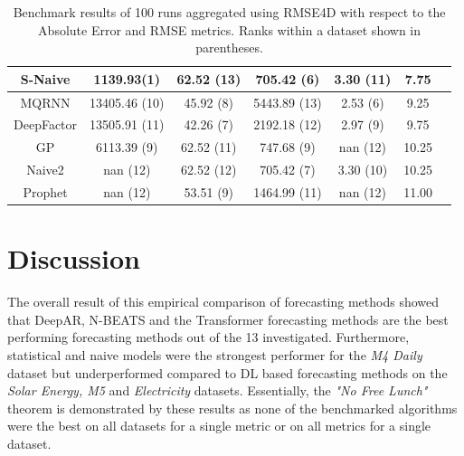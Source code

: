 \begin{table}[htb]
\begin{tabular}{ccccccc}
    S-Naive     & 1139.93(1) \cellcolor{green!100}  & \cellcolor{red!70} 62.52 (13)   & 705.42 (6)                        & \cellcolor{red!50} 3.30 (11)    & 7.75                \\\hline
    MQRNN       & \cellcolor{red!30} 13405.46 (10)  & 45.92 (8)                       & \cellcolor{red!70} 5443.89 (13)   & 2.53 (6)                        & 9.25                \\\hline
    DeepFactor  & \cellcolor{red!50} 13505.91 (11)  & 42.26 (7)                       & \cellcolor{red!50} 2192.18 (12)   & 2.97 (9)                        & 9.75                \\\hline
    GP          & 6113.39 (9)                       & \cellcolor{red!30} 62.52 (11)   & 747.68 (9)                        & \cellcolor{red!70} nan (12)     & 10.25               \\\hline
    Naive2      & \cellcolor{red!70} nan (12)       & \cellcolor{red!50} 62.52 (12)   & 705.42 (7)                        & \cellcolor{red!30} 3.30 (10)    & 10.25               \\\hline
    Prophet     & \cellcolor{red!70} nan (12)       & 53.51 (9)                       & \cellcolor{red!30} 1464.99 (11)   & \cellcolor{red!70} nan (12)     & 11.00               \\\hline
  \end{tabular}
  \caption{Benchmark results of 100 runs aggregated using RMSE4D with respect to the Absolute Error and RMSE metrics. Ranks within a dataset shown in parentheses.}
  \label{tab:benchmark_results_abs_rmse}
\end{table}

\section{Discussion}
\label{sec:empirical_discussion}
The overall result of this empirical comparison of forecasting methods showed that DeepAR, N-BEATS and the Transformer forecasting methods are the best performing forecasting methods out of the 13 investigated. Furthermore, statistical and naive models were the strongest performer for the \textit{M4 Daily} dataset but underperformed compared to DL based forecasting methods on the \textit{Solar Energy, M5} and \textit{Electricity} datasets. Essentially, the \textit{"No Free Lunch"} theorem is demonstrated by these results as none of the benchmarked algorithms were the best on all datasets for a single metric or on all metrics for a single dataset.

